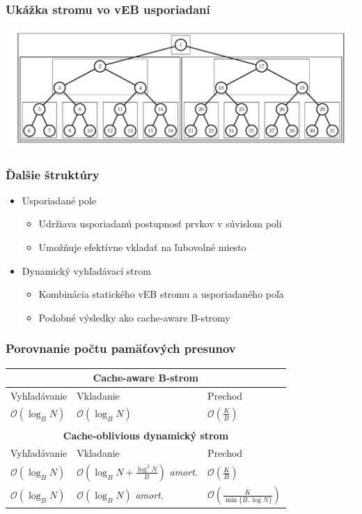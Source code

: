\documentclass{beamer}
\newcommand{\bigO}{\ensuremath{\mathcal{O}}}
\begin{document}
\begin{frame}
    \frametitle{Ukážka stromu vo vEB usporiadaní}
    \centerline{\includegraphics[width=1.1\textwidth]{../figures/vEB_tree/node_order_veb}}
\end{frame}

\begin{frame}
    \frametitle{Ďalšie štruktúry}
    \begin{itemize}
        \item Usporiadané pole
        \begin{itemize}
            \item Udržiava usporiadanú postupnosť prvkov v súvislom poli
            \item Umožňuje efektívne vkladať na ľubovolné miesto
        \end{itemize}                

        \item Dynamický vyhľadávací strom
        \begin{itemize}
            \item Kombinácia statického vEB stromu a usporiadaného poľa
            \item Podobné výsledky ako cache-aware B-stromy
        \end{itemize}        
    \end{itemize}
\end{frame}

\newcommand{\amort}{{\small \textit{amort.}}}
\begin{frame}
    \frametitle{Porovnanie počtu pamäťových presunov}
    {\renewcommand{\arraystretch}{1.5}
    \begin{tabular}{lll}
        \hline \multicolumn{3}{c}{\textbf{Cache-aware B-strom}} \\ \hline
        Vyhľadávanie & Vkladanie & Prechod \\ \hline
        $\bigO(\log_B{N})$ & $\bigO(\log_B{N})$ & $\bigO(\frac{K}{B})$ \\
        \\
        \hline \multicolumn{3}{c}{\textbf{Cache-oblivious dynamický strom}} \\ \hline 
        Vyhľadávanie & Vkladanie & Prechod \\ \hline
        $\bigO(\log_B{N})$ & $\bigO(\log_B{N}+\frac{\log^2{N}}{B})$ \amort & $\bigO(\frac{K}{B})$  \\
        $\bigO(\log_B{N})$ & $\bigO(\log_B{N})$ \amort & $\bigO(\frac{K}{\min\{B,\log N\}})$
    \end{tabular}
    }
\end{frame}
\end{document}
